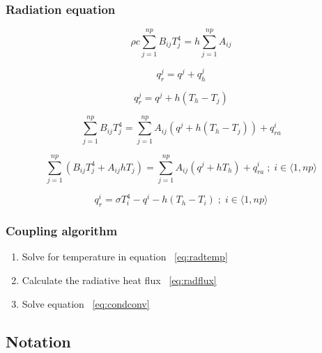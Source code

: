 \documentclass[a4paper,10pt]{book}
\begin{document}
\subsubsection{Radiation equation}

    \begin{equation}
    \rho{c}\sum_{j=1}^{np}B_{ij}T_j^4=h\sum_{j=1}^{np}A_{ij}
    \end{equation}

    \begin{equation}
    q_r^j=q^j+q_h^j
    \end{equation}

    \begin{equation}
    q_r^j=q^j+h\left(T_h-T_j\right)
    \end{equation}

    \begin{equation}
    \sum_{j=1}^{np}B_{ij}T_j^4=
    \sum_{j=1}^{np}A_{ij}\left(q^j+h\left(T_h-T_j\right)\right)+q_{ra}^i
    \end{equation}

    \begin{equation} \label{eq:radtemp}
    \sum_{j=1}^{np}\left(B_{ij}T_j^4+A_{ij}hT_j\right)=
    \sum_{j=1}^{np}A_{ij}\left(q^j+hT_h\right)+q_{ra}^i\;;\;i\in\langle1,np\rangle
    \end{equation}

    \begin{equation} \label{eq:radflux}
    q_r^i=\sigma{T_i^4}-q^i-h\left(T_h-T_i\right)\;;\;i\in\langle1,np\rangle
    \end{equation}

\subsubsection{Coupling algorithm}

\begin{enumerate}
    \item Solve for temperature in equation ~\ref{eq:radtemp}
    \item Calculate the radiative heat flux ~\ref{eq:radflux}
    \item Solve equation ~\ref{eq:condconv}
\end{enumerate}

\subsection{Notation}
\end{document}
